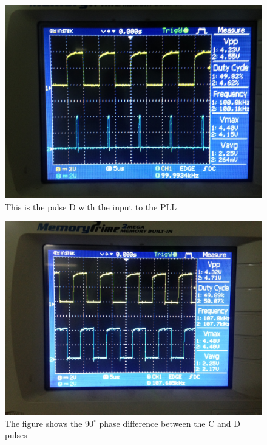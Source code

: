 \documentclass{article}
\begin{document}
\begin{figure}[h]
	\centering
	\includegraphics[scale = 0.4]{images/Diff_one_pulse.JPG}
	\caption{This is the pulse D with the input to the PLL}
	\label{Fig :1b}
\end{figure}

\begin{figure}[h]
	\centering
	\includegraphics[scale = 0.4]{images/CD.JPG}
	\caption{The figure shows the $90^\circ$ phase difference between the C and D pulses}
	\label{Fig :1b}
\end{figure}
\end{document}
